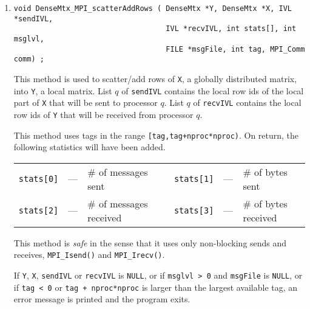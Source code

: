 \begin{enumerate}
or if {\tt tag < 0} or {\tt tag + nproc*nproc} 
is larger than the largest available tag,
an error message is printed and the program exits.
\item
\begin{verbatim}
void DenseMtx_MPI_scatterAddRows ( DenseMtx *Y, DenseMtx *X, IVL *sendIVL, 
                                   IVL *recvIVL, int stats[], int msglvl, 
                                   FILE *msgFile, int tag, MPI_Comm comm) ;
\end{verbatim}
This method is used to scatter/add rows of {\tt X}, a globally
distributed matrix, into {\tt Y}, a local matrix.
List $q$ of {\tt sendIVL} contains the local row ids of the local
part of {\tt X} that will be sent to processor $q$.
List $q$ of {\tt recvIVL} contains the local row ids of {\tt Y}
that will be received from processor $q$.
\par
This method uses tags in the range {\tt [tag,tag+nproc*nproc)}.
On return, the following statistics will have been added.
\begin{center}
\begin{tabular}{cclcccl}
{\tt stats[0]} & --- & \# of messages sent 
& &
{\tt stats[1]} & --- & \# of bytes sent \\
{\tt stats[2]} & --- & \# of messages received 
& &
{\tt stats[3]} & --- & \# of bytes received 
\end{tabular}
\end{center}
This method is {\it safe} in the sense that it uses only
non-blocking sends and receives, 
{\tt MPI\_Isend()} and {\tt MPI\_Irecv()}.
\par {}
If {\tt Y}, {\tt X}, {\tt sendIVL} 
or {\tt recvIVL} is {\tt NULL}, 
or if {\tt msglvl > 0} and {\tt msgFile} is {\tt NULL},
or if {\tt tag < 0} or {\tt tag + nproc*nproc} 
is larger than the largest available tag,
an error message is printed and the program exits.
\end{enumerate}
\par

